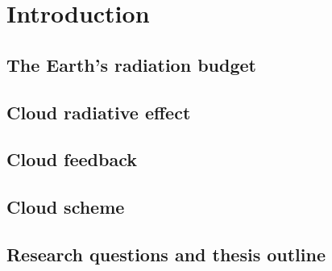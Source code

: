 \chapter{Introduction}
\label{ch:introduction}

\section{The Earth’s radiation budget}

\section{Cloud radiative effect}

\section{Cloud feedback}

\section{Cloud scheme}

\section{Research questions and thesis outline}
\label{sec:thesis_layout}
